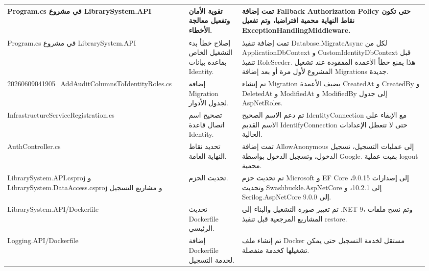 \documentclass[12pt,a4paper]{article}
\begin{document}
\begin{longtable}{|p{4cm}|p{5.5cm}|p{5.5cm}|}
\textenglish{Program.cs} في مشروع \textenglish{LibrarySystem.API} &
تقوية الأمان وتفعيل معالجة الأخطاء. &
تمت إضافة \textenglish{Fallback Authorization Policy} حتى تكون نقاط النهاية محمية افتراضيا، وتم تفعيل \textenglish{ExceptionHandlingMiddleware}. \\
\hline

\textenglish{Program.cs} في مشروع \textenglish{LibrarySystem.API} &
إصلاح خطأ بدء التشغيل الخاص بقاعدة بيانات Identity. &
تمت إضافة تنفيذ \textenglish{Database.MigrateAsync} لكل من \textenglish{ApplicationDbContext} و \textenglish{CustomIdentityDbContext} قبل تنفيذ \textenglish{RoleSeeder}. هذا يمنع خطأ الأعمدة المفقودة عند تشغيل المشروع لأول مرة أو بعد إضافة Migrations جديدة. \\
\hline

\textenglish{20260609041905\_AddAuditColumnsToIdentityRoles.cs} &
إضافة Migration لجدول الأدوار. &
تم إنشاء Migration يضيف الأعمدة \textenglish{CreatedAt} و \textenglish{CreatedBy} و \textenglish{DeletedAt} و \textenglish{ModifiedAt} و \textenglish{ModifiedBy} إلى جدول \textenglish{AspNetRoles}. \\
\hline

\textenglish{InfrastructureServiceRegistration.cs} &
تصحيح اسم اتصال قاعدة Identity. &
تم دعم الاسم الصحيح \textenglish{IdentityConnection} مع الإبقاء على الاسم القديم \textenglish{IdentifyConnection} حتى لا تتعطل الإعدادات الحالية. \\
\hline

\textenglish{AuthController.cs} &
تحديد نقاط النهاية العامة. &
تمت إضافة \textenglish{AllowAnonymous} إلى عمليات التسجيل، تسجيل الدخول، وتسجيل الدخول بواسطة Google. بقيت عملية \textenglish{logout} محمية. \\
\hline

\textenglish{LibrarySystem.API.csproj} و \textenglish{LibrarySystem.DataAccess.csproj} و مشاريع التسجيل &
تحديث الحزم. &
تم تحديث حزم Microsoft و EF Core إلى إصدارات \textenglish{9.0.15}، وتحديث \textenglish{Swashbuckle.AspNetCore} إلى \textenglish{10.2.1}، و \textenglish{Serilog.AspNetCore} إلى \textenglish{9.0.0}. \\
\hline

\textenglish{LibrarySystem.API/Dockerfile} &
تحديث Dockerfile الرئيسي. &
تم تغيير صورة التشغيل والبناء إلى \textenglish{.NET 9}، وتم نسخ ملفات المشاريع المرجعية قبل تنفيذ \textenglish{restore}. \\
\hline

\textenglish{Logging.API/Dockerfile} &
إضافة Dockerfile لخدمة التسجيل. &
تم إنشاء ملف Docker مستقل لخدمة التسجيل حتى يمكن تشغيلها كخدمة منفصلة. \\
\hline


\end{longtable}
\end{document}

